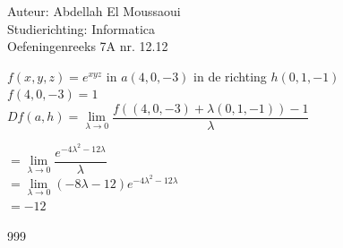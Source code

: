 \documentclass[a4paper]{article}
\begin{document}
  
\noindent \large Auteur: Abdellah El Moussaoui \\
\noindent \large Studierichting: Informatica\\
\noindent \large Oefeningenreeks 7A nr. 12.12\\

\medskip

\normalsize

$f(x,y,z) =e^{xyz}$ in $a(4,0,-3)$ in de richting $h(0,1,-1)$\\

$f(4,0,-3) = 1$\\

$Df(a,h) = \lim\limits_{\lambda \rightarrow 0} \dfrac{f\left((4,0,-3) + \lambda(0,1,-1)\right) - 1}{\lambda}$

$= \lim\limits_{\lambda \rightarrow 0} \dfrac{e^{-4\lambda^2-12\lambda}}{\lambda}$\\


$= \lim\limits_{\lambda \rightarrow 0} \left(-8\lambda-12\right)e^{-4\lambda^2-12\lambda}$\\


$ = -12$\\


\begin{thebibliography}{999}
\end{thebibliography}
\end{document}
